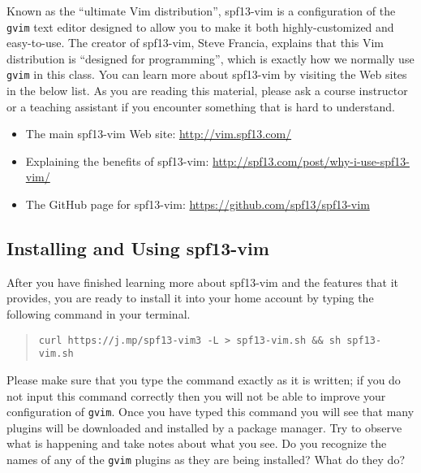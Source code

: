Known as the ``ultimate Vim distribution'', spf13-vim is a configuration of the {\tt gvim} text editor designed to allow
you to make it both highly-customized and easy-to-use.  The creator of spf13-vim, Steve Francia, explains that this Vim
distribution is ``designed for programming'', which is exactly how we normally use {\tt gvim} in this class. You can
learn more about spf13-vim by visiting the Web sites in the below list.  As you are reading this material, please ask a course
instructor or a teaching assistant if you encounter something that is hard to understand.

\vspace*{-.1in}
\begin{itemize}
  \setlength{\itemsep}{.01in}
  \item The main spf13-vim Web site: \url{http://vim.spf13.com/}
  \item Explaining the benefits of spf13-vim: \url{http://spf13.com/post/why-i-use-spf13-vim/}
  \item The GitHub page for spf13-vim: \url{https://github.com/spf13/spf13-vim}
\end{itemize}

\vspace*{-.30in}
\subsection*{Installing and Using spf13-vim} 
\vspace*{-.05in}

After you have finished learning more about spf13-vim and the features that it provides, you are ready to install it
into your home account by typing the following command in your terminal.

\vspace*{-.125in}
\begin{quote}
  {\tt curl https://j.mp/spf13-vim3 -L > spf13-vim.sh \&\& sh spf13-vim.sh}
\end{quote}
\vspace*{-.125in}

Please make sure that you type the command exactly as it is written; if you do not input this command correctly then you
will not be able to improve your configuration of {\tt gvim}. Once you have typed this command you will see that many
plugins will be downloaded and installed by a package manager.  Try to observe what is happening and take notes about
what you see. Do you recognize the names of any of the {\tt gvim} plugins as they are being installed? What do they do?

